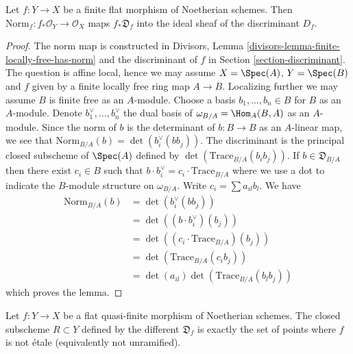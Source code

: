 \begin{lemma}
\label{lemma-norm-different-in-discriminant}
Let $f : Y \to X$ be a finite flat morphism of Noetherian schemes.
Then $\text{Norm}_f : f_*\mathcal{O}_Y \to \mathcal{O}_X$ maps
$f_*\mathfrak{D}_f$ into the ideal sheaf of the discriminant $D_f$.
\end{lemma}

\begin{proof}
The norm map is constructed in
Divisors, Lemma \ref{divisors-lemma-finite-locally-free-has-norm}
and the discriminant of $f$ in Section \ref{section-discriminant}.
The question is affine local, hence we may assume $X = \Spec(A)$,
$Y = \Spec(B)$ and $f$ given by a finite locally free ring map $A \to B$.
Localizing further we may assume $B$ is finite free as an $A$-module.
Choose a basis $b_1, \ldots, b_n \in B$ for $B$ as an $A$-module.
Denote $b_1^\vee, \ldots, b_n^\vee$ the dual basis of
$\omega_{B/A} = \Hom_A(B, A)$ as an $A$-module.
Since the norm of $b$ is the determinant of $b : B \to B$ as an
$A$-linear map, we see that
$\text{Norm}_{B/A}(b) = \det(b_i^\vee(bb_j))$.
The discriminant is the principal closed subscheme of $\Spec(A)$
defined by $\det(\text{Trace}_{B/A}(b_ib_j))$.
If $b \in \mathfrak{D}_{B/A}$ then
there exist $c_i \in B$ such that
$b \cdot b_i^\vee = c_i \cdot \text{Trace}_{B/A}$ where
we use a dot to indicate the $B$-module structure on $\omega_{B/A}$.
Write $c_i = \sum a_{il} b_l$.
We have
\begin{align*}
\text{Norm}_{B/A}(b)
& =
\det(b_i^\vee(bb_j)) \\
& =
\det( (b \cdot b_i^\vee)(b_j)) \\
& =
\det((c_i \cdot \text{Trace}_{B/A})(b_j)) \\
& =
\det(\text{Trace}_{B/A}(c_ib_j)) \\
& =
\det(a_{il}) \det(\text{Trace}_{B/A}(b_l b_j))
\end{align*}
which proves the lemma.
\end{proof}

\begin{lemma}
\label{lemma-different-ramification}
Let $f : Y \to X$ be a flat quasi-finite morphism of Noetherian schemes.
The closed subscheme $R \subset Y$ defined by the different $\mathfrak{D}_f$
is exactly the set of points where $f$ is not \'etale
(equivalently not unramified).
\end{lemma}

